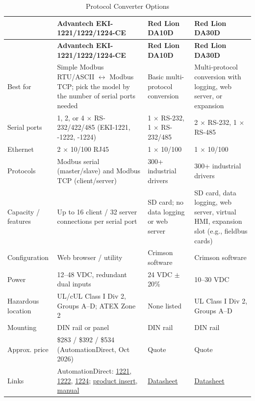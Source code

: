 \begin{longtable}{@{}P{3.49cm}P{4.33cm}P{4.33cm}P{4.33cm}@{}}
\caption{Protocol Converter Options}\label{tab:protocol-converters} \\
\toprule
{} & \textbf{Advantech EKI-1221/1222/1224-CE} & \textbf{Red Lion DA10D} & \textbf{Red Lion DA30D} \\
\midrule
\endfirsthead
\toprule
{} & \textbf{Advantech EKI-1221/1222/1224-CE} & \textbf{Red Lion DA10D} & \textbf{Red Lion DA30D} \\
\midrule
\endhead
Best for & Simple Modbus RTU/ASCII $\leftrightarrow$ Modbus TCP; pick the model by the number of serial ports needed & Basic multi-protocol conversion & Multi-protocol conversion with logging, web server, or expansion \\
Serial ports & 1, 2, or 4 $\times$ RS-232/422/485 (EKI-1221, -1222, -1224) & 1 $\times$ RS-232, 1 $\times$ RS-232/485 & 2 $\times$ RS-232, 1 $\times$ RS-485 \\
Ethernet & 2 $\times$ 10/100 RJ45 & 1 $\times$ 10/100 & 1 $\times$ 10/100 \\
Protocols & Modbus serial (master/slave) and Modbus TCP (client/server) & 300+ industrial drivers & 300+ industrial drivers \\
Capacity / features & Up to 16 client / 32 server connections per serial port & SD card; no data logging or web server & SD card, data logging, web server, virtual HMI, expansion slot (e.g., fieldbus cards) \\
Configuration & Web browser / utility & Crimson software & Crimson software \\
Power & 12--48 VDC, redundant dual inputs & 24 VDC $\pm$20\% & 10--30 VDC \\
Hazardous location & UL/cUL Class I Div 2, Groups A--D; ATEX Zone 2 & None listed & UL Class I Div 2, Groups A--D \\
Mounting & DIN rail or panel & DIN rail & DIN rail \\
Approx. price & \$283 / \$392 / \$534 (AutomationDirect, Oct 2026) & Quote & Quote \\
Links & AutomationDirect: \href{https://www.automationdirect.com/adc/shopping/catalog/communications/protocol_gateways/modbus_gateways/eki-1221-ce}{1221}, \href{https://www.automationdirect.com/adc/shopping/catalog/communications/protocol_gateways/modbus_gateways/eki-1222-ce}{1222}, \href{https://www.automationdirect.com/adc/shopping/catalog/communications/protocol_gateways/modbus_gateways/eki-1224-ce}{1224}; \href{https://cdn.automationdirect.com/static/manuals/advantechmbgateway/eki122x_insert.pdf}{product insert}, \href{https://cdn.automationdirect.com/static/manuals/advantechmbgateway/advmbgatewayum.pdf}{manual} & \href{https://cdn.logic-control.com/docs/red-lion/Datasheets/Data\%20Stations/DA10D_and_DA30D_Datasheet.pdf}{Datasheet} & \href{https://cdn.logic-control.com/docs/red-lion/Datasheets/Data\%20Stations/DA10D_and_DA30D_Datasheet.pdf}{Datasheet} \\
\bottomrule
\end{longtable}

